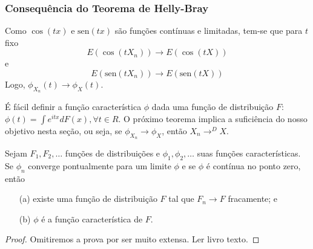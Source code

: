 \begin{frame}
\frametitle{\textbf{Consequência do Teorema de Helly-Bray}}
\baselineskip=13pt
\begin{block}{}

Como $\cos(tx)$ e $\mbox{sen}(tx)$ são funções contínuas e
limitadas, tem-se que para $t$ fixo
$$E(\cos(tX_n))\rightarrow E(\cos(tX))$$
e
$$E(\mbox{sen}(tX_n))\rightarrow E(\mbox{sen}(tX))$$
Logo, $\phi_{X_n}(t)\rightarrow \phi_X(t)$.


\end{block}
%
%
%

É fácil definir a função característica $\phi$ dada uma função de
distribuição $F$: $\phi(t)=\int e^{itx}dF(x),\forall t\in R$. O
próximo teorema implica a suficiência do nosso objetivo nesta seção,
ou seja, se $\phi_{X_n}\rightarrow\phi_X$, então $X_n\rightarrow^D
X$.

\begin{teo}
Sejam $F_1,F_2,\ldots$ funções de distribuições e
$\phi_1,\phi_2,\ldots$ suas funções características. Se $\phi_n$
converge pontualmente para um limite $\phi$ e se $\phi$ é contínua
no ponto zero, então
\begin{enumerate}
\item[(a)] existe uma função de distribuição $F$ tal que $F_n\rightarrow
F$ fracamente; e

\item[(b)] $\phi$ é a função característica de $F$.
\end{enumerate}
\end{teo}

\begin{proof}
	Omitiremos a prova por ser muito extensa. Ler livro texto.
\end{proof}

\end{frame}


